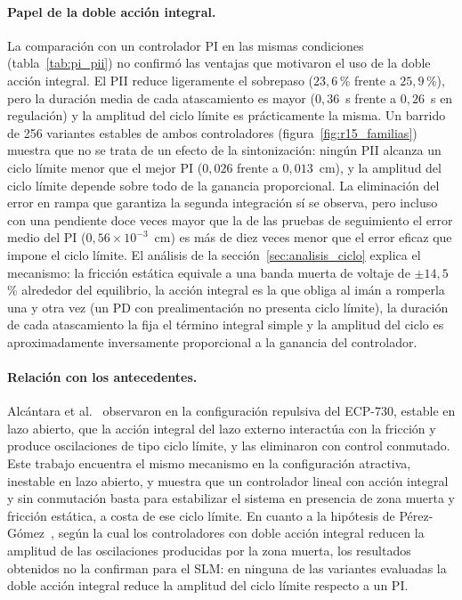 \paragraph{Papel de la doble acción integral.}
La comparación con un controlador PI en las mismas condiciones (tabla~\ref{tab:pi_pii}) no confirmó las ventajas que motivaron el uso de la doble acción integral. El PII reduce ligeramente el sobrepaso ($23{,}6$\,\% frente a $25{,}9$\,\%), pero la duración media de cada atascamiento es mayor ($0{,}36$~s frente a $0{,}26$~s en regulación) y la amplitud del ciclo límite es prácticamente la misma. Un barrido de 256 variantes estables de ambos controladores (figura~\ref{fig:r15_familias}) muestra que no se trata de un efecto de la sintonización: ningún PII alcanza un ciclo límite menor que el mejor PI ($0{,}026$ frente a $0{,}013$~cm), y la amplitud del ciclo límite depende sobre todo de la ganancia proporcional. La eliminación del error en rampa que garantiza la segunda integración sí se observa, pero incluso con una pendiente doce veces mayor que la de las pruebas de seguimiento el error medio del PI ($0{,}56\times10^{-3}$~cm) es más de diez veces menor que el error eficaz que impone el ciclo límite. El análisis de la sección~\ref{sec:analisis_ciclo} explica el mecanismo: la fricción estática equivale a una banda muerta de voltaje de $\pm14{,}5$\,\% alrededor del equilibrio, la acción integral es la que obliga al imán a romperla una y otra vez (un PD con prealimentación no presenta ciclo límite), la duración de cada atascamiento la fija el término integral simple y la amplitud del ciclo es aproximadamente inversamente proporcional a la ganancia del controlador.

\paragraph{Relación con los antecedentes.}
Alcántara et al.~\cite{alcantara} observaron en la configuración repulsiva del ECP-730, estable en lazo abierto, que la acción integral del lazo externo interactúa con la fricción y produce oscilaciones de tipo ciclo límite, y las eliminaron con control conmutado. Este trabajo encuentra el mismo mecanismo en la configuración atractiva, inestable en lazo abierto, y muestra que un controlador lineal con acción integral y sin conmutación basta para estabilizar el sistema en presencia de zona muerta y fricción estática, a costa de ese ciclo límite. En cuanto a la hipótesis de Pérez-Gómez~\cite{perez}, según la cual los controladores con doble acción integral reducen la amplitud de las oscilaciones producidas por la zona muerta, los resultados obtenidos no la confirman para el SLM: en ninguna de las variantes evaluadas la doble acción integral reduce la amplitud del ciclo límite respecto a un PI.

